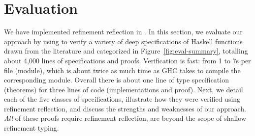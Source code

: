 \section{Evaluation}\label{sec:evaluation}





\begin{figure}[t!]

\end{figure}
\begin{figure}[t!]

\end{figure}



We have implemented refinement reflection
in \toolname.
%
In this section, we evaluate our approach
by using \toolname to verify a variety of
deep specifications of Haskell functions
drawn from the literature and categorized
in Figure~\ref{fig:eval-summary},
totalling about 4,000 lines of specifications
and proofs.
%
Verification is fast: from 1 to 7s per
file (module), which is about twice as
much time as GHC takes to compile the
corresponding module.
%
Overall there is about one line of
type specification (theorems)
for three lines of code (implementations and proof).
%
Next, we detail each of the five classes of
specifications, illustrate how they were
verified using refinement reflection, and
discuss the strengths and weaknesses of
our approach.
%
\emph{All} of these proofs require refinement
reflection, \ie are beyond the scope of shallow
refinement typing.

